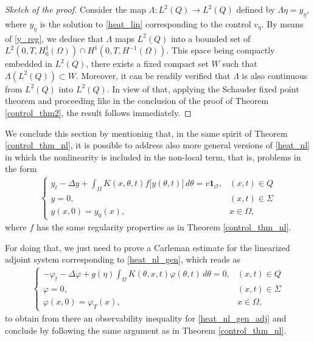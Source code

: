\documentclass[preprint,1p]{elsarticle}
\newcommand{\D}{\displaystyle}
\begin{document}
\begin{proof}[Sketch of the proof]
Consider the map $\Lambda: L^2(Q)\to L^2(Q)$ defined by $\Lambda\eta = y_\eta$, where $y_\eta$ is the solution to \eqref{heat_lin} corresponding to the control $v_\eta$. By means of \eqref{y_reg}, we deduce that $\Lambda$ maps $L^2(Q)$ into a bounded set of $L^2(0,T,H^1_0(\Omega))\cap H^1(0,T,H^{-1}(\Omega))$. This space being compactly embedded in $L^2(Q)$, there exists a fixed compact set $W$ such that $\Lambda(L^2(Q))\subset W$. Moreover, it can be readily verified that $\Lambda$ is also continuous from $L^2(Q)$ into $L^2(Q)$. In view of that, applying the Schauder fixed point theorem and proceeding like in the conclusion of the proof of Theorem \ref{control_thm2}, the result follows immediately.
\end{proof}

We conclude this section by mentioning that, in the same spirit of Theorem \ref{control_thm_nl}, it is possible to address also more general versions of \eqref{heat_nl} in which the nonlinearity is included in the non-local term, that is, problems in the form
\begin{align}\label{heat_nl_gen}
	\begin{cases}
		\D y_t - \Delta y + \int_\Omega K(x,\theta,t)f\big[y(\theta,t)\big]\,d\theta = v\mathbf{1}_{\mathcal O}, & (x,t)\in Q
		\\
		y = 0, & (x,t)\in\Sigma
		\\
		y(x,0) = y_0(x), & x\in\Omega,
	\end{cases}
\end{align}
where $f$ has the same regularity properties as in Theorem \ref{control_thm_nl}. 

For doing that, we just need to prove a Carleman estimate for the linearized adjoint system corresponding to \eqref{heat_nl_gen}, which reads as
\begin{align}\label{heat_nl_gen_adj}
	\begin{cases}
		\D -\varphi_t - \Delta \varphi + g(\eta)\int_\Omega K(\theta,x,t)\varphi(\theta,t)\,d\theta = 0, & (x,t)\in Q
		\\
		\varphi = 0, & (x,t)\in\Sigma
		\\
		\varphi(x,0) = \varphi_T(x), & x\in\Omega,
	\end{cases}
\end{align}
to obtain from there an observability inequality for \eqref{heat_nl_gen_adj} and conclude by following the same argument as in Theorem \ref{control_thm_nl}.
\end{document}
